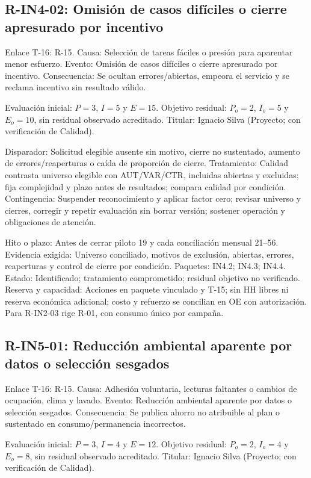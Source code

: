 \subsection{R-IN4-02: Omisión de casos difíciles o cierre apresurado por incentivo}
Enlace T-16: R-15. Causa: Selección de tareas fáciles o presión para aparentar menor esfuerzo. Evento: Omisión de casos difíciles o cierre apresurado por incentivo. Consecuencia: Se ocultan errores/abiertas, empeora el servicio y se reclama incentivo sin resultado válido.

Evaluación inicial: $P=3$, $I=5$ y $E=15$. Objetivo residual: $P_o=2$, $I_o=5$ y $E_o=10$, sin residual observado acreditado. Titular: Ignacio Silva (Proyecto; con verificación de Calidad).

Disparador: Solicitud elegible ausente sin motivo, cierre no sustentado, aumento de errores/reaperturas o caída de proporción de cierre. Tratamiento: Calidad contrasta universo elegible con AUT/VAR/CTR, incluidas abiertas y excluidas; fija complejidad y plazo antes de resultados; compara calidad por condición. Contingencia: Suspender reconocimiento y aplicar factor cero; revisar universo y cierres, corregir y repetir evaluación sin borrar versión; sostener operación y obligaciones de atención.

Hito o plazo: Antes de cerrar piloto 19 y cada conciliación mensual 21--56. Evidencia exigida: Universo conciliado, motivos de exclusión, abiertas, errores, reaperturas y control de cierre por condición. Paquetes: IN4.2; IN4.3; IN4.4. Estado: Identificado; tratamiento comprometido; residual objetivo no verificado. Reserva y capacidad: Acciones en paquete vinculado y T-15; sin HH libres ni reserva económica adicional; costo y refuerzo se concilian en OE con autorización. Para R-IN2-03 rige R-01, con consumo único por campaña.

\subsection{R-IN5-01: Reducción ambiental aparente por datos o selección sesgados}
Enlace T-16: R-15. Causa: Adhesión voluntaria, lecturas faltantes o cambios de ocupación, clima y lavado. Evento: Reducción ambiental aparente por datos o selección sesgados. Consecuencia: Se publica ahorro no atribuible al plan o sustentado en consumo/permanencia incorrectos.

Evaluación inicial: $P=3$, $I=4$ y $E=12$. Objetivo residual: $P_o=2$, $I_o=4$ y $E_o=8$, sin residual observado acreditado. Titular: Ignacio Silva (Proyecto; con verificación de Calidad).

